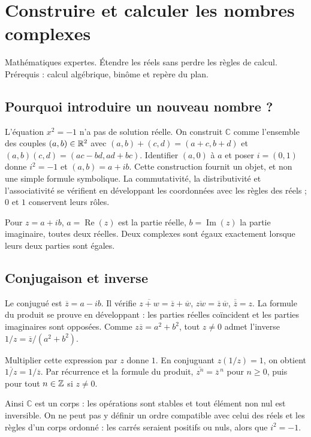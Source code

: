 \documentclass[../cours_tle.tex]{subfiles}
\begin{document}
\setcounter{chapter}{24}
\chapter{Construire et calculer les nombres complexes}
\label{ch:25}
\begin{objectif}
Mathématiques expertes. Étendre les réels sans perdre les règles de calcul. Prérequis : calcul algébrique, binôme et repère du plan.
\end{objectif}
\section{Pourquoi introduire un nouveau nombre ?}
L'équation $x^2=-1$ n'a pas de solution réelle. On construit $\mathbb C$ comme l'ensemble des couples $(a,b)\in\mathbb{R}^2$ avec
$(a,b)+(c,d)=(a+c,b+d)$ et $(a,b)(c,d)=(ac-bd,ad+bc)$.
Identifier $(a,0)$ à $a$ et poser $i=(0,1)$ donne $i^2=-1$ et $(a,b)=a+ib$.
Cette construction fournit un objet, et non une simple formule symbolique.
La commutativité, la distributivité et l'associativité se vérifient en développant les coordonnées avec les règles des réels ; $0$ et $1$ conservent leurs rôles.
\begin{definition}
Pour $z=a+ib$, $a=\operatorname{Re}(z)$ est la partie réelle, $b=\operatorname{Im}(z)$ la partie imaginaire, toutes deux réelles.
Deux complexes sont égaux exactement lorsque leurs deux parties sont égales.
\end{definition}
\section{Conjugaison et inverse}
Le conjugué est $\overline z=a-ib$. Il vérifie
$\overline{z+w}=\overline z+\overline w$, $\overline{zw}=\overline z\,\overline w$, $\overline{\overline z}=z$.
La formule du produit se prouve en développant : les parties réelles coïncident et les parties imaginaires sont opposées.
Comme $z\overline z=a^2+b^2$, tout $z\ne0$ admet l'inverse
$1/z=\overline z/(a^2+b^2)$.
\begin{demonstration}
Multiplier cette expression par $z$ donne $1$. En conjuguant $z(1/z)=1$, on obtient $\overline{1/z}=1/\overline z$. Par récurrence et la formule du produit, $\overline{z^n}=\overline z^{\,n}$ pour $n\ge0$, puis pour tout $n\in\mathbb{Z}$ si $z\ne0$.
\end{demonstration}
Ainsi $\mathbb C$ est un corps : les opérations sont stables et tout élément non nul est inversible. On ne peut pas y définir un ordre compatible avec celui des réels et les règles d'un corps ordonné : les carrés seraient positifs ou nuls, alors que $i^2=-1$.
\end{document}
